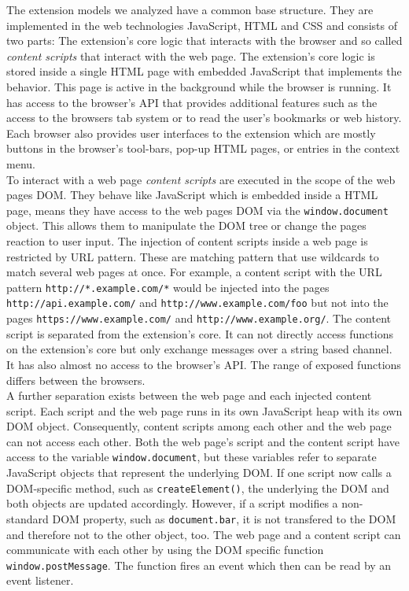 	
	The extension models we analyzed have a common base structure. They are implemented in the web technologies JavaScript, HTML and CSS and consists of two parts: The extension's core logic that interacts with the browser and so called \textit{content scripts} that interact with the web page. The extension's core logic is stored inside a single HTML page with embedded JavaScript that implements the behavior. This page is active in the background while the browser is running. It has access to the browser's API that provides additional features such as the access to the browsers tab system or to read the user's bookmarks or web history. Each browser also provides user interfaces to the extension which are mostly buttons in the browser's tool-bars, pop-up HTML pages, or entries in the context menu. \\
	To interact with a web page \textit{content scripts} are executed in the scope of the web pages DOM. They behave like JavaScript which is embedded inside a HTML page, means they have access to the web pages DOM via the \texttt{window.document} object. This allows them to manipulate the DOM tree or change the pages reaction to user input. The injection of content scripts inside a web page is restricted by URL pattern. These are matching pattern that use wildcards to match several web pages at once. For example, a content script with the URL pattern \texttt{http://*.example.com/*} would be injected into the pages \texttt{http://api.example.com/} and \texttt{http://www.example.com/foo} but not into the pages \texttt{https://www.example.com/} and \texttt{http://www.example.org/}. The content script is separated from the extension's core. It can not directly access functions on the extension's core but only exchange messages over a string based channel. It has also almost no access to the browser's API. The range of exposed functions differs between the browsers. \\ 
	A further separation exists between the web page and each injected content script. Each script and the web page runs in its own JavaScript heap with its own DOM object. Consequently, content scripts among each other and the web page can not access each other. Both the web page's script and the content script have access to the variable \texttt{window.document}, but these variables refer to separate JavaScript objects that represent the underlying DOM. If one script now calls a DOM-specific method, such as \texttt{createElement()}, the underlying the DOM and both objects are updated accordingly. However, if a script modifies a non-standard DOM property, such as \texttt{document.bar}, it is not transfered to the DOM and therefore not to the other object, too. The web page and a content script can communicate with each other by using the DOM specific function \texttt{window.postMessage}. The function fires an event which then can be read by an event listener.
	
